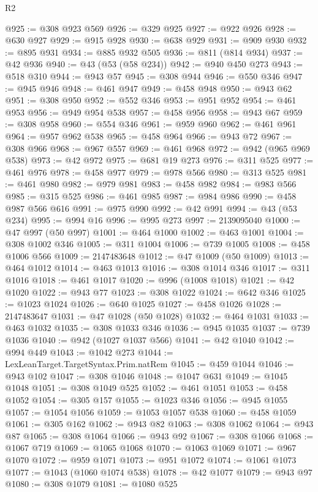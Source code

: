 \begin{lexlean}{R2}
\begin{coremodule}
@925 := @308 @923 @569
@926 := @329 @925
@927 := @922 @926
@928 := @630 @927
@929 := @915 @928
@930 := @638 @929
@931 := @909 @930
@932 := @895 @931
@934 := @885 @932 @505
@936 := @811 (@814 @934)
@937 := @42 @936
@940 := @43 (@53 (@58 @234))
@942 := @940 @450 @273
@943 := @518 @310
@944 := @943 @57
@945 := @308 @944
@946 := @550 @346
@947 := @945 @946
@948 := @461 @947
@949 := @458 @948
@950 := @943 @62
@951 := @308 @950
@952 := @552 @346
@953 := @951 @952
@954 := @461 @953
@956 := @949 @954 @538
@957 := @458 @956
@958 := @943 @67
@959 := @308 @958
@960 := @554 @346
@961 := @959 @960
@962 := @461 @961
@964 := @957 @962 @538
@965 := @458 @964
@966 := @943 @72
@967 := @308 @966
@968 := @967 @557
@969 := @461 @968
@972 := @942 (@965 @969 @538)
@973 := @42 @972
@975 := @681 @19 @273
@976 := @311 @525
@977 := @461 @976
@978 := @458 @977
@979 := @978 @566
@980 := @313 @525
@981 := @461 @980
@982 := @979 @981
@983 := @458 @982
@984 := @983 @566
@985 := @315 @525
@986 := @461 @985
@987 := @984 @986
@990 := @458 @987 @566 @616
@991 := @975 @990
@992 := @42 @991
@994 := @43 (@53 @234)
@995 := @994 @16
@996 := @995 @273
@997 := 2139095040
@1000 := @47 @997 (@50 @997)
@1001 := @464 @1000
@1002 := @463 @1001
@1004 := @308 @1002 @346
@1005 := @311 @1004
@1006 := @739 @1005
@1008 := @458 @1006 @566
@1009 := 2147483648
@1012 := @47 @1009 (@50 @1009)
@1013 := @464 @1012
@1014 := @463 @1013
@1016 := @308 @1014 @346
@1017 := @311 @1016
@1018 := @461 @1017
@1020 := @996 (@1008 @1018)
@1021 := @42 @1020
@1022 := @943 @77
@1023 := @308 @1022
@1024 := @642 @346
@1025 := @1023 @1024
@1026 := @640 @1025
@1027 := @458 @1026
@1028 := 2147483647
@1031 := @47 @1028 (@50 @1028)
@1032 := @464 @1031
@1033 := @463 @1032
@1035 := @308 @1033 @346
@1036 := @945 @1035
@1037 := @739 @1036
@1040 := @942 (@1027 @1037 @566)
@1041 := @42 @1040
@1042 := @994 @449
@1043 := @1042 @273
@1044 := LexLeanTarget.TargetSyntax.Prim.natRem
@1045 := @459 @1044
@1046 := @943 @102
@1047 := @308 @1046
@1048 := @1047 @631
@1049 := @1045 @1048
@1051 := @308 @1049 @525
@1052 := @461 @1051
@1053 := @458 @1052
@1054 := @305 @157
@1055 := @1023 @346
@1056 := @945 @1055
@1057 := @1054 @1056
@1059 := @1053 @1057 @538
@1060 := @458 @1059
@1061 := @305 @162
@1062 := @943 @82
@1063 := @308 @1062
@1064 := @943 @87
@1065 := @308 @1064
@1066 := @943 @92
@1067 := @308 @1066
@1068 := @1067 @719
@1069 := @1065 @1068
@1070 := @1063 @1069
@1071 := @967 @1070
@1072 := @959 @1071
@1073 := @951 @1072
@1074 := @1061 @1073
@1077 := @1043 (@1060 @1074 @538)
@1078 := @42 @1077
@1079 := @943 @97
@1080 := @308 @1079
@1081 := @1080 @525

\end{coremodule}
\end{lexlean}
